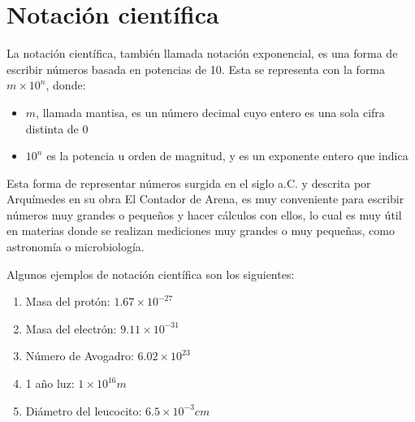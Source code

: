 \section{Notación científica}

La notación científica, también llamada notación exponencial, es una forma de escribir números basada en potencias de 10. Esta se representa con la forma $m \times 10^{n}$, donde:

\begin{itemize}
    \item $m$, llamada mantisa, es un número decimal cuyo entero es una sola cifra distinta de 0
    \item $10^{n}$ es la potencia u orden de magnitud, y es un exponente entero que indica 
\end{itemize}

Esta forma de representar números surgida en el siglo  a.C. y descrita por Arquímedes en su obra El Contador de Arena, es muy conveniente para escribir números muy grandes o pequeños y hacer cálculos con ellos, lo cual es muy útil en materias donde se realizan mediciones muy grandes o muy pequeñas, como astronomía o microbiología.

Algunos ejemplos de notación científica son los siguientes:

\begin{enumerate}
    \item Masa del protón: $1.67 \times 10^{-27}$
    \item Masa del electrón: $9.11 \times 10^{-31}$
    \item Número de Avogadro: $6.02 \times 10^{23}$
    \item 1 año luz: $1 \times 10^{16}m$
    \item Diámetro del leucocito: $6.5 \times 10^{-3}cm$
\end{enumerate}